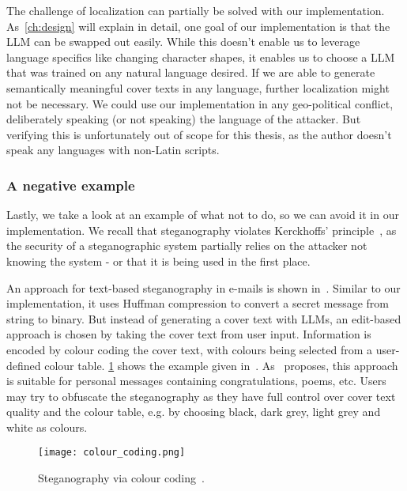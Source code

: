 The challenge of localization can partially be solved with our implementation. As~\cref{ch:design} will explain in detail, one goal of our implementation is that the \gls{LLM} can be swapped out easily. While this doesn't enable us to leverage language specifics like changing character shapes, it enables us to choose a \gls{LLM} that was trained on any natural language desired. If we are able to generate semantically meaningful cover texts in any language, further localization might not be necessary. We could use our implementation in any geo-political conflict, deliberately speaking (or not speaking) the language of the attacker. But verifying this is unfortunately out of scope for this thesis, as the author doesn't speak any languages with non-Latin scripts.

\subsubsection{A negative example}
\label{sec:aNegativeExample}
Lastly, we take a look at an example of what not to do, so we can avoid it in our implementation. We recall that steganography violates Kerckhoffs' principle~\cite{andersonLimitsSteganography1998}, as the security of a steganographic system partially relies on the attacker not knowing the system - or that it is being used in the first place.

An approach for text-based steganography in e-mails is shown in~\cite{malikHighCapacityText2017}. Similar to our implementation, it uses Huffman compression to convert a secret message from string to binary. But instead of generating a cover text with \glspl{LLM}, an edit-based approach is chosen by taking the cover text from user input. Information is encoded by colour coding the cover text, with colours being selected from a user-defined colour table. \cref{fig:colourCoding} shows the example given in~\cite{malikHighCapacityText2017}. As~\cite{malikHighCapacityText2017} proposes, this approach is suitable for personal messages containing congratulations, poems, etc. Users may try to obfuscate the steganography as they have full control over cover text quality and the colour table, e.g. by choosing black, dark grey, light grey and white as colours.

\begin{figure}
    \begin{wide}
        \centering
        \captionsetup{width=\linewidth}
        \texttt{[image: colour\_coding.png]}
        \caption[Colour coding]{Steganography via colour coding~\cite{malikHighCapacityText2017}.}
        \label{fig:colourCoding}
    \end{wide}
\end{figure}


